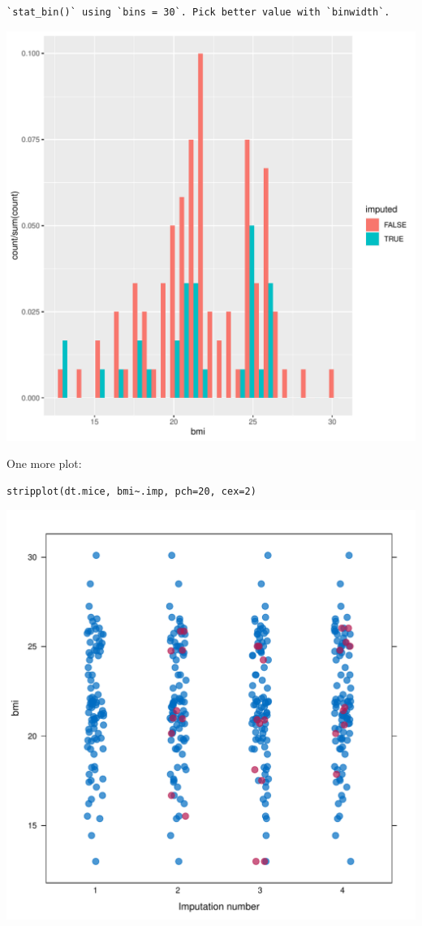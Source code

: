 \documentclass[12pt]{article}
\begin{document}
\begin{verbatim}
`stat_bin()` using `bins = 30`. Pick better value with `binwidth`.
\end{verbatim}

\begin{center}
\includegraphics[width=.9\linewidth]{./histImputed.pdf}
\end{center}

One more plot:

\lstset{language=r,label= ,caption= ,captionpos=b,numbers=none}
\begin{lstlisting}
stripplot(dt.mice, bmi~.imp, pch=20, cex=2)
\end{lstlisting}

\begin{center}
\includegraphics[width=.9\linewidth]{./striplotImputed.pdf}
\end{center}
\end{document}
